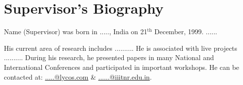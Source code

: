 \chapter*{Supervisor\rq s Biography}
{\LARGE N}ame (Supervisor) was born in ....., India on 21$^{\mathrm{th}}$ December, 1999. ......

His current area of research includes .......... He is associated with live projects .......... During his research, he presented papers in many National and International Conferences and participated in important workshops. He can be contacted at: \url{.....@lycos.com} \& \url{......@iiitnr.edu.in}.


